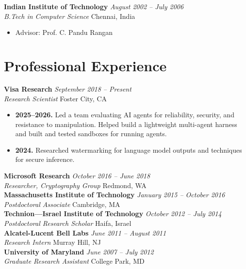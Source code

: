 \documentclass[11pt]{article}
\newcommand{\entry}[4]{
    \vspace{1.5mm}
    \noindent\textbf{#1} \hfill \textit{#2} \\
    \noindent\textit{#3} \hfill #4 \\
}
\begin{document}
\entry{Indian Institute of Technology}{August 2002 – July 2006}{B.Tech in Computer Science}{Chennai, India}
\begin{itemize}[leftmargin=*, noitemsep]
    \item Advisor: Prof. C. Pandu Rangan
\end{itemize}

\section{Professional Experience}
\entry{Visa Research}{September 2018 – Present}{Research Scientist}{Foster City, CA}
\begin{itemize}[leftmargin=*, noitemsep, topsep=0pt]
    \item \textbf{2025--2026.} Led a team evaluating AI agents for reliability, security, and resistance to manipulation. Helped build a lightweight multi-agent harness and built and tested sandboxes for running agents.
    \item \textbf{2024.} Researched watermarking for language model outputs and techniques for secure inference.
\end{itemize}

\entry{Microsoft Research}{October 2016 – June 2018}{Researcher, Cryptography Group}{Redmond, WA}

\entry{Massachusetts Institute of Technology}{January 2015 – October 2016}{Postdoctoral Associate}{Cambridge, MA}

\entry{Technion—Israel Institute of Technology}{October 2012 – July 2014}{Postdoctoral Research Scholar}{Haifa, Israel}

\entry{Alcatel-Lucent Bell Labs}{June 2011 – August 2011}{Research Intern}{Murray Hill, NJ}

\entry{University of Maryland}{June 2007 – July 2012}{Graduate Research Assistant}{College Park, MD}

\end{document}
